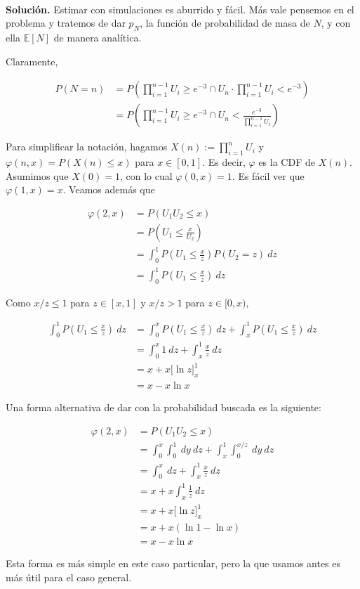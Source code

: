 \documentclass[a4paper, 12pt]{article}
\begin{document}
~

\textbf{Solución.} Estimar con simulaciones es aburrido y fácil. Más vale pensemos en el problema y
tratemos de dar $p_N$, la función de probabilidad de masa de $N$, y con ella
$\mathbb{E}\left[ N \right] $ de manera analítica.

Claramente, 

\begin{align*}
  P(N = n) 
  &= P \left( \prod_{i=1}^{n-1} U_i \geq e^{-3} \cap U_n \cdot \prod_{i=1}^{n-1}
  U_i < e^{-3}\right) \\ 
  &= P \left( \prod_{i=1}^{n-1} U_i \geq e^{-3} \cap U_n  <
    \frac{e^{-3}}{\prod_{i=1}^{n-1}U_i }\right) 
\end{align*}

Para simplificar la notación, hagamos $X(n) := \prod_{i=1}^n U_i$ y $\varphi(n,
x) = P(X(n) \leq x)$ para $x \in [0, 1]$. Es decir, $\varphi$ es la CDF de
$X(n)$. Asumimos que $X(0) = 1$, con lo cual $\varphi(0, x) = 1$. Es fácil ver
que $\varphi(1, x) = x$. Veamos además que 

\begin{align*}
  \varphi(2, x) 
  &= P(U_1 U_2 \leq x) \\ 
  &= P(U_1 \leq \frac{x}{U_2}) \\ 
  &= \int_0^1 P(U_1 \leq \frac{x}{z}) P(U_2 = z) ~ dz  \\ 
  &= \int_0^1 P\left( U_1 \leq \frac{x}{z} \right)  ~ dz
\end{align*}

Como $x / z \leq 1$ para $z \in [x, 1]$ y $x / z > 1$ para $z \in [0, x)$,

\begin{align*}
  \int_0^1 P\left( U_1 \leq \frac{x}{z} \right) ~ dz 
  &=\int_0^x P\left( U_1 \leq \frac{x}{z} \right) ~ dz + \int_x^1 P\left( U_1
  \leq \frac{x}{z} \right) ~ dz \\ 
  &= \int_0^x 1 ~ dz + \int_x^1 \frac{x}{z} ~ dz \\ 
  &= x + x \Big[ \ln z\Big]_x^1 \\ 
  &= x - x \ln x
\end{align*}

\begin{myframe}
  Una forma alternativa de dar con la probabilidad buscada es la siguiente:
  
\begin{align*}
  \varphi(2, x) 
  &= P(U_1 U_2 \leq x)  \\ 
  &=\int_0^x \int_0^1 ~ dy ~ dz + \int_x^1 \int_{0}^{x / z} ~ dy ~ dz \\ 
  &=\int_0^x ~ dz + \int_{x}^1 \frac{x}{z} ~ dz \\ 
  &= x + x \int_x^1 \frac{1}{z} ~ dz \\ 
  &= x + x \Big[ \ln z \Big]_{x}^1 \\ 
  &= x + x(\ln 1 - \ln x) \\ 
  &= x - x \ln x
\end{align*}

Esta forma es más simple en este caso particular, pero la que usamos antes
es más útil para el caso general.
\end{myframe}
\end{document}
